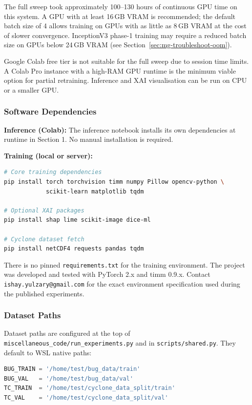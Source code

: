 \documentclass[12pt,a4paper]{article}
\begin{document}
The full sweep took approximately 100--130 hours of continuous GPU time on
this system. A GPU with at least 16\,GB VRAM is recommended; the default
batch size of 4 allows training on GPUs with as little as 8\,GB VRAM at the
cost of slower convergence. InceptionV3 phase-1 training may require a
reduced batch size on GPUs below 24\,GB VRAM (see
Section~\ref{sec:mg-troubleshoot-oom}).

Google Colab free tier is not suitable for the full sweep due to session time
limits. A Colab Pro instance with a high-RAM GPU runtime is the minimum viable
option for partial retraining. Inference and XAI visualisation can be run on
CPU or a smaller GPU.

\subsubsection{Software Dependencies}

\textbf{Inference (Colab):} The inference notebook installs its own
dependencies at runtime in Section 1. No manual installation is required.

\textbf{Training (local or server):}

\begin{lstlisting}[language=bash]
# Core training dependencies
pip install torch torchvision timm numpy Pillow opencv-python \
            scikit-learn matplotlib tqdm

# Optional XAI packages
pip install shap lime scikit-image dice-ml

# Cyclone dataset fetch
pip install netCDF4 requests pandas tqdm
\end{lstlisting}

There is no pinned \texttt{requirements.txt} for the training environment.
The project was developed and tested with PyTorch 2.x and timm 0.9.x.
Contact \texttt{ishay.yulzary@gmail.com} for the exact environment
specification used during the published experiments.

\subsubsection{Dataset Paths}

Dataset paths are configured at the top of
\texttt{miscellaneous\_code/run\_experiments.py} and in
\texttt{scripts/shared.py}. They default to WSL native paths:

\begin{lstlisting}[language=Python]
BUG_TRAIN = '/home/test/bug_data/train'
BUG_VAL   = '/home/test/bug_data/val'
TC_TRAIN  = '/home/test/cyclone_data_split/train'
TC_VAL    = '/home/test/cyclone_data_split/val'
\end{lstlisting}
\end{document}

